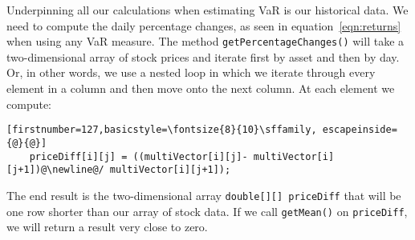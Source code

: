 \documentclass[../Dissertation.tex]{subfiles}
\begin{document}
Underpinning all our calculations when estimating VaR is our historical data.
We need to compute the daily percentage changes, as seen in equation~\ref{eqn:returns} when using any VaR measure.
The method \lstinline|getPercentageChanges()| will take a two-dimensional array of stock prices and iterate first by asset and then by day.
Or, in other words, we use a nested loop in which we iterate through every element in a column and then move onto the next column.
At each element we compute:
\begin{lstlisting}[firstnumber=127,basicstyle=\fontsize{8}{10}\sffamily, escapeinside={@}{@}]
	priceDiff[i][j] = ((multiVector[i][j]- multiVector[i][j+1])@\newline@/ multiVector[i][j+1]);
\end{lstlisting}
The end result is the two-dimensional array \lstinline|double[][] priceDiff| that will be one row shorter than our array of stock data.
If we call \lstinline|getMean()| on \lstinline|priceDiff|, we will return a result very close to zero.


\end{document}

